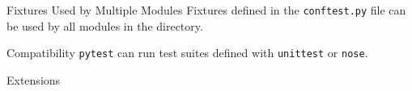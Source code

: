   \begin{frame}{Fixtures Used by Multiple Modules}
  Fixtures defined in the \texttt{conftest.py} file can be used by all modules in the directory.
  \end{frame}
  
  \begin{frame}{Compatibility}
  \texttt{pytest} can run test suites defined with \texttt{unittest} or \texttt{nose}.
  \end{frame}
  
  \begin{frame}{Extensions}
  \end{frame}